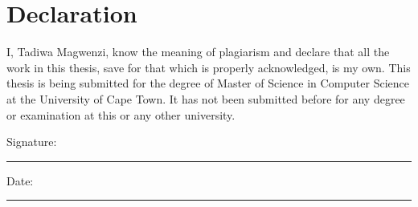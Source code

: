 \section*{Declaration}

\noindent I, Tadiwa Magwenzi, know the meaning of plagiarism and declare that all the work in this thesis, save for that which is properly acknowledged, is my own. This thesis is being submitted for the degree of Master of Science in Computer Science at the University of Cape Town. It has not been submitted before for any degree or examination at this or any other university.

\vspace{1cm}

\noindent Signature: \rule{5cm}{0.4pt}

\noindent Date: \rule{5cm}{0.4pt}
